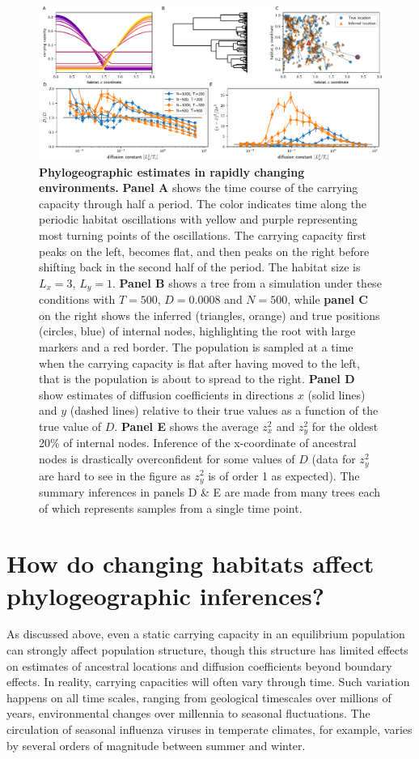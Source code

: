 \documentclass[aps,rmp, twocolumn]{revtex4}
\begin{document}
\begin{figure}[tb]
    \includegraphics[width=\textwidth]{figures/Fig4}
    \caption{\label{fig:seasaw} {\bf Phylogeographic estimates in rapidly changing environments.} {\bf Panel A} shows the time course of the carrying capacity through half a period. The color indicates time along the periodic habitat oscillations with yellow and purple representing most turning points of the oscillations. The carrying capacity first peaks on the left, becomes flat, and then peaks on the right before shifting back in the second half of the period. The habitat size is $L_x=3$, $L_y=1$.
    {\bf Panel B} shows a tree from a simulation under these conditions with $T=500$, $D=0.0008$ and $N=500$, while {\bf panel C} on the right shows the inferred (triangles, orange) and true positions (circles, blue) of internal nodes, highlighting the root with large markers and a red border.
    The population is sampled at a time when the carrying capacity is flat after having moved to the left, that is the population is about to spread to the right.
    {\bf Panel D} show estimates of diffusion coefficients in directions $x$ (solid lines) and $y$ (dashed lines) relative to their true values as a function of the true value of $D$.
    {\bf Panel E} shows the average $z_x^2$ and $z_y^2$ for the oldest 20\% of internal nodes. Inference of the x-coordinate of ancestral nodes is drastically overconfident for some values of $D$ (data for $z_y^2$ are hard to see in the figure as $z_y^2$ is of order 1 as expected).
    The summary inferences in panels D \& E are made from many trees each of which represents samples from a single time point.}
\end{figure}

\section*{How do changing habitats affect phylogeographic inferences?}
As discussed above, even a static carrying capacity in an equilibrium population can strongly affect population structure, though this structure has limited effects on estimates of ancestral locations and diffusion coefficients beyond boundary effects.
In reality, carrying capacities will often vary through time.
Such variation happens on all time scales, ranging from geological timescales over millions of years, environmental changes over millennia to seasonal fluctuations.
The circulation of seasonal influenza viruses in temperate climates, for example, varies by several orders of magnitude between summer and winter.
\end{document}
